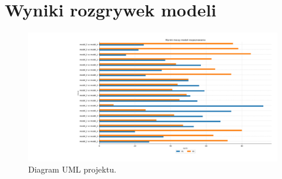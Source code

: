 \documentclass[12pt,oneside,a4paper]{report}
\begin{document}
\section{Wyniki rozgrywek modeli}

\begin{figure}[!ht]
  \centering
  \hspace*{-1cm}   
  \includegraphics[width=1.1\textwidth]{./img/mecze.png}
  \caption{Diagram UML projektu.}
\end{figure}
\end{document}
